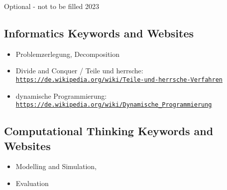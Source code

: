 \documentclass[a4paper,11pt]{report}
\newcommand{\BrochureUrlText}[1]{\texttt{#1}}
\begin{document}
Optional - not to be filled 2023


\subsection*{Informatics Keywords and Websites}

\begin{itemize}
  \item Problemzerlegung, Decomposition
  \item Divide and Conquer / Teile und herrsche: \href{https://de.wikipedia.org/wiki/Teile-und-herrsche-Verfahren}{\BrochureUrlText{https://de.wikipedia.org/wiki/Teile-und-herrsche-Verfahren}}
  \item dynamische Programmierung: \href{https://de.wikipedia.org/wiki/Dynamische_Programmierung}{\BrochureUrlText{https://de.wikipedia.org/wiki/Dynamische\_Programmierung}}
\end{itemize}


\subsection*{Computational Thinking Keywords and Websites}

\begin{itemize}
  \item Modelling and Simulation,
  \item Evaluation
\end{itemize}
\end{document}
